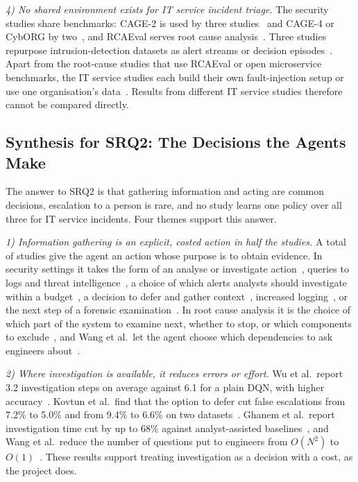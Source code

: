 \emph{4) No shared environment exists for IT service incident triage.} The security studies share benchmarks: CAGE-2 is used by three studies~\cite{hammar2026belief,hammar2025,nyberg2024} and CAGE-4 or CybORG by two~\cite{castro2025,contractor2025}, and RCAEval serves root cause analysis~\cite{rojasrodriguez2026}. Three studies repurpose intrusion-detection datasets as alert streams or decision episodes~\cite{okafor2026,kovtun2026,alturkistani2022}. Apart from the root-cause studies that use RCAEval or open microservice benchmarks, the IT service studies each build their own fault-injection setup or use one organisation's data~\cite{peralta2025,wang2023hrlhf,ding2023,wu2026,yuan2026}. Results from different IT service studies therefore cannot be compared directly.

\subsection{Synthesis for SRQ2: The Decisions the Agents Make}

The answer to SRQ2 is that gathering information and acting are common decisions, escalation to a person is rare, and no study learns one policy over all three for IT service incidents. Four themes support this answer.

\emph{1) Information gathering is an explicit, costed action in half the studies.} A total of \NInfo{} studies give the agent an action whose purpose is to obtain evidence. In security settings it takes the form of an analyse or investigate action~\cite{hammar2026belief,hammar2025,nyberg2024,castro2025,contractor2025,okafor2026}, queries to logs and threat intelligence~\cite{sahin2026}, a choice of which alerts analysts should investigate within a budget~\cite{tong2020}, a decision to defer and gather context~\cite{kovtun2026}, increased logging~\cite{jaber2025}, or the next step of a forensic examination~\cite{ghanem2026,dunsin2025}. In root cause analysis it is the choice of which part of the system to examine next, whether to stop, or which components to exclude~\cite{rojasrodriguez2026,wang2024mrca,wu2026,ding2023}, and Wang et al.\ let the agent choose which dependencies to ask engineers about~\cite{wang2023hrlhf}.

\emph{2) Where investigation is available, it reduces errors or effort.} Wu et al.\ report 3.2 investigation steps on average against 6.1 for a plain DQN, with higher accuracy~\cite{wu2026}. Kovtun et al.\ find that the option to defer cut false escalations from 7.2\% to 5.0\% and from 9.4\% to 6.6\% on two datasets~\cite{kovtun2026}. Ghanem et al.\ report investigation time cut by up to 68\% against analyst-assisted baselines~\cite{ghanem2026}, and Wang et al.\ reduce the number of questions put to engineers from $O(N^2)$ to $O(1)$~\cite{wang2023hrlhf}. These results support treating investigation as a decision with a cost, as the project does.


